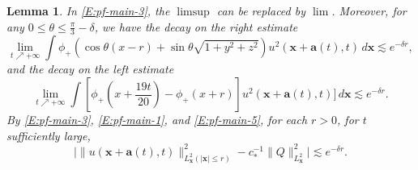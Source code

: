 \documentclass[12pt,letterpaper]{amsart}
\newtheorem{lemma}[theorem]{Lemma}
\theoremstyle{remark}
\numberwithin{equation}{section}
\numberwithin{theorem}{section}
\numberwithin{table}{section}
\begin{document}
\begin{lemma}
\label{L:u-decay}
In \eqref{E:pf-main-3}, the $\limsup$ can be replaced by $\lim$.  Moreover, for any $0\leq \theta \leq \frac{\pi}{3}-\delta$, we have the decay on the right estimate
\begin{equation}
\label{E:pf-main-1}
\lim_{t\nearrow +\infty} \int \phi_+\left(\cos\theta(x-r) + \sin\theta \sqrt{1+y^2+z^2}\right)u^2(\mathbf{x}+\mathbf{a}(t),t) \, d\mathbf{x} \lesssim e^{-\delta r},
\end{equation}
and the decay on the left estimate
\begin{equation}
\label{E:pf-main-5}
\lim_{t\nearrow +\infty} \int [\phi_+(x+\frac{19t}{20}) - \phi_+(x+r)] u^2(\mathbf{x}+\mathbf{a}(t),t)] \, d\mathbf{x} \lesssim e^{-\delta r}.
\end{equation}
By \eqref{E:pf-main-3}, \eqref{E:pf-main-1}, and \eqref{E:pf-main-5},  for each $r>0$, for $t$ sufficiently large,
\begin{equation}
\label{E:pf-main-11}
\Big| \| u( \mathbf{x} + \mathbf{a}(t),t) \|_{L_{\mathbf{x}}^2(|\mathbf{x}|\leq r)}^2 - c_*^{-1} \|Q\|_{L_{\mathbf{x}}^2}^2 \Big| \lesssim e^{-\delta r}.
\end{equation}
\end{lemma}
\end{document}
